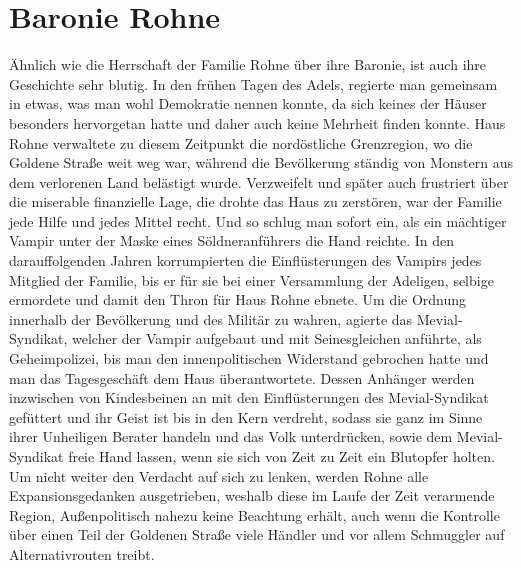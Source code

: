 \documentclass[a4paper,12pt,oneside]{book}
\begin{document}
\section{Baronie Rohne}
Ähnlich wie die Herrschaft der Familie Rohne über ihre Baronie, ist auch ihre Geschichte sehr blutig. In den frühen Tagen des Adels, regierte man gemeinsam in etwas, was man wohl Demokratie nennen konnte, da sich keines der Häuser besonders hervorgetan hatte und daher auch keine Mehrheit finden konnte. Haus Rohne verwaltete zu diesem Zeitpunkt die nordöstliche Grenzregion, wo die Goldene Straße weit weg war, während die Bevölkerung ständig von Monstern aus dem verlorenen Land belästigt wurde. Verzweifelt und später auch frustriert über die miserable finanzielle Lage, die drohte das Haus zu zerstören, war der Familie jede Hilfe und jedes Mittel recht. Und so schlug man sofort ein, als ein mächtiger Vampir unter der Maske eines Söldneranführers die Hand reichte. In den darauffolgenden Jahren korrumpierten die Einflüsterungen des Vampirs jedes Mitglied der Familie, bis er für sie bei einer Versammlung der Adeligen, selbige ermordete und damit den Thron für Haus Rohne ebnete. Um die Ordnung innerhalb der Bevölkerung und des Militär zu wahren, agierte das Mevial-Syndikat, welcher der Vampir aufgebaut und mit Seinesgleichen anführte, als Geheimpolizei, bis man den innenpolitischen Widerstand gebrochen hatte und man das Tagesgeschäft dem Haus überantwortete. Dessen Anhänger werden inzwischen von Kindesbeinen an mit den Einflüsterungen des Mevial-Syndikat gefüttert und ihr Geist ist bis in den Kern verdreht, sodass sie ganz im Sinne ihrer Unheiligen Berater handeln und das Volk unterdrücken, sowie dem Mevial-Syndikat freie Hand lassen, wenn sie sich von Zeit zu Zeit ein Blutopfer holten. Um nicht weiter den Verdacht auf sich zu lenken, werden Rohne alle Expansionsgedanken ausgetrieben, weshalb diese im Laufe der Zeit verarmende Region, Außenpolitisch nahezu keine Beachtung erhält, auch wenn die Kontrolle über einen Teil der Goldenen Straße viele Händler und vor allem Schmuggler auf Alternativrouten treibt.
\end{document}
